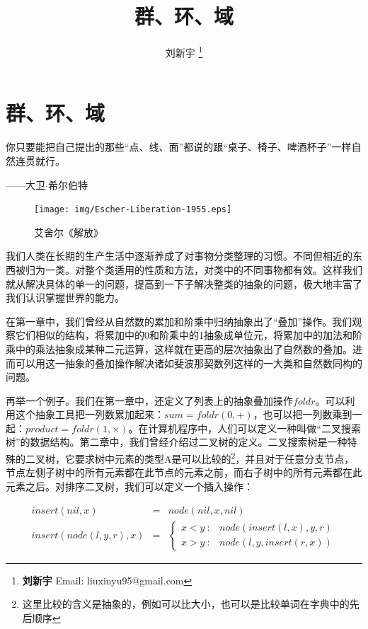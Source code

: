 \documentclass{article}
\begin{document}
\title{群、环、域}

\author{刘新宇
\thanks{{\bfseries 刘新宇} \newline
  Email: liuxinyu95@gmail.com \newline}
  }

\maketitle
\fi


\ifx\wholebook\relax
\chapter{群、环、域}
\fi

\epigraph{你只要能把自己提出的那些“点、线、面”都说的跟“桌子、椅子、啤酒杯子”一样自然连贯就行。}{——大卫$\cdot$希尔伯特}

\begin{figure}
 \centering
 \texttt{[image: img/Escher-Liberation-1955.eps]}
 \captionsetup{labelformat=empty}
 \caption{艾舍尔《解放》}
 \label{fig:Escher-liberation}
\end{figure}

我们人类在长期的生产生活中逐渐养成了对事物分类整理的习惯。不同但相近的东西被归为一类。对整个类适用的性质和方法，对类中的不同事物都有效。这样我们就从解决具体的单一的问题，提高到一下子解决整类的抽象的问题，极大地丰富了我们认识掌握世界的能力。

在第一章中，我们曾经从自然数的累加和阶乘中归纳抽象出了“叠加”操作。我们观察它们相似的结构，将累加中的0和阶乘中的1抽象成单位元，将累加中的加法和阶乘中的乘法抽象成某种二元运算，这样就在更高的层次抽象出了自然数的叠加。进而可以用这一抽象的叠加操作解决诸如斐波那契数列这样的一大类和自然数同构的问题。

再举一个例子。我们在第一章中，还定义了列表上的抽象叠加操作$foldr$。可以利用这个抽象工具把一列数累加起来：$sum = foldr(0, +)$，也可以把一列数乘到一起：$product = foldr(1, \times)$。在计算机程序中，人们可以定义一种叫做“二叉搜索树”的数据结构。第二章中，我们曾经介绍过二叉树的定义。二叉搜索树是一种特殊的二叉树，它要求树中元素的类型A是可以比较的\footnote{这里比较的含义是抽象的，例如可以比大小，也可以是比较单词在字典中的先后顺序}，并且对于任意分支节点，节点左侧子树中的所有元素都在此节点的元素之前，而右子树中的所有元素都在此元素之后。对排序二叉树，我们可以定义一个插入操作：

\[
\begin{array}{rcl}
  insert(nil, x) & = & node(nil, x, nil) \\
  insert(node(l, y, r), x) & = & \left.
  \begin{cases}
  x < y\ : & node(insert(l, x), y, r) \\
  x > y\ : & node(l, y, insert(r, x))
  \end{cases} \right.
\end{array}
\label{eq:BST-insert}
\]
\end{document}
